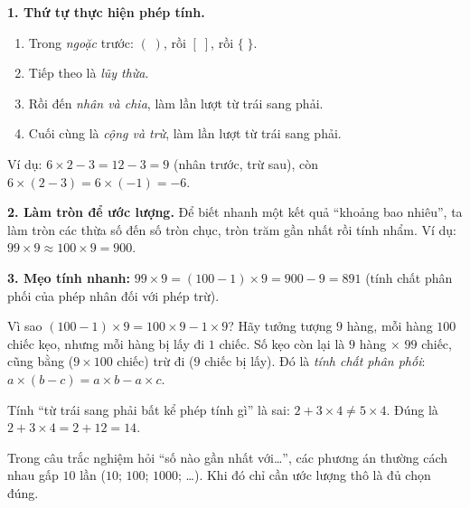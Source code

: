 \begin{knowbox}
\textbf{1. Thứ tự thực hiện phép tính.}
\begin{enumerate}[leftmargin=1.6em,itemsep=1pt,topsep=2pt]
  \item Trong \emph{ngoặc} trước: $(\;)$, rồi $[\;]$, rồi $\{\;\}$.
  \item Tiếp theo là \emph{lũy thừa}.
  \item Rồi đến \emph{nhân và chia}, làm lần lượt từ trái sang phải.
  \item Cuối cùng là \emph{cộng và trừ}, làm lần lượt từ trái sang phải.
\end{enumerate}
Ví dụ: $6\times 2 - 3 = 12 - 3 = 9$ (nhân trước, trừ sau), còn $6\times(2-3) = 6\times(-1) = -6$.

\textbf{2. Làm tròn để ước lượng.} Để biết nhanh một kết quả ``khoảng bao nhiêu'', ta làm tròn các thừa số đến số
tròn chục, tròn trăm gần nhất rồi tính nhẩm. Ví dụ: $99 \times 9 \approx 100 \times 9 = 900$.

\textbf{3. Mẹo tính nhanh:} $99 \times 9 = (100-1)\times 9 = 900 - 9 = 891$ (tính chất phân phối của phép nhân
đối với phép trừ).
\end{knowbox}
\begin{proofbox}
Vì sao $(100-1)\times 9 = 100\times 9 - 1\times 9$? Hãy tưởng tượng $9$ hàng, mỗi hàng $100$ chiếc kẹo,
nhưng mỗi hàng bị lấy đi $1$ chiếc. Số kẹo còn lại là $9$ hàng $\times$ $99$ chiếc, cũng bằng
($9\times 100$ chiếc) trừ đi ($9$ chiếc bị lấy). Đó là \emph{tính chất phân phối}: $a\times(b-c) = a\times b - a\times c$.
\end{proofbox}
\begin{warnbox}
Tính ``từ trái sang phải bất kể phép tính gì'' là sai: $2 + 3\times 4 \ne 5\times 4$. Đúng là
$2 + 3\times 4 = 2 + 12 = 14$.
\end{warnbox}
\begin{tipbox}
Trong câu trắc nghiệm hỏi ``số nào gần nhất với\ldots'', các phương án thường cách nhau gấp $10$ lần
($10$; $100$; $1000$; \ldots). Khi đó chỉ cần ước lượng thô là đủ chọn đúng.
\end{tipbox}

